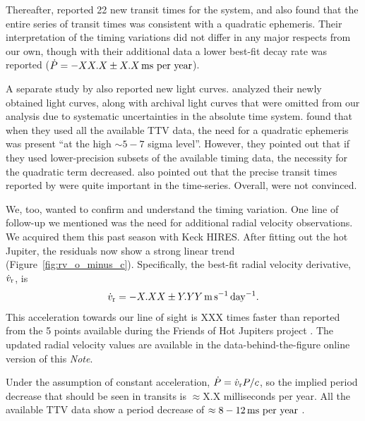 \documentclass[RNAAS]{aastex62}
\begin{document}
Thereafter, \citet{southworth_transit_2019} reported 22 new transit
times for the system, and also found that the entire series of transit
times was consistent with a quadratic ephemeris.  Their interpretation
of the timing variations did not differ in any major respects from our
own, though with their additional data a lower best-fit decay rate was
reported ($\dot{P} = -XX.X \pm X.X\,{\rm ms\ per\ year}$).

A separate study by \citet{baluev_homogeneously_2019} also reported
new light curves. \citeauthor{baluev_homogeneously_2019} analyzed
their newly obtained light curves, along with archival light curves
that were omitted from our analysis due to systematic uncertainties in
the absolute time system.  \citeauthor{baluev_homogeneously_2019}
found that when they used all the available TTV data, the need for a
quadratic ephemeris was present ``at the high $\sim 5-7$ sigma
level''.  However, they pointed out that if they used lower-precision
subsets of the available timing data, the necessity for the quadratic
term decreased.  \citeauthor{baluev_homogeneously_2019} also pointed
out that the precise transit times reported by
\citet{huitson_gemini_2017} were quite important in the time-series.
Overall, \citeauthor{baluev_homogeneously_2019} were not convinced.

We, too, wanted to confirm and understand the timing variation.  One
line of follow-up we mentioned was the need for additional radial
velocity observations.  We acquired them this past season with Keck
HIRES.
After fitting out the hot Jupiter, the residuals now show a strong
linear trend  (Figure~\ref{fig:rv_o_minus_c}).
Specifically, the best-fit radial velocity derivative, $\dot{v}_{\rm
r}$, is
\begin{equation}
  \dot{v}_{\rm r} = - X.XX \pm Y.YY\,{\rm m\,s^{-1}\,day^{-1}}.
\end{equation}
This acceleration towards our line of sight is XXX times faster than 
reported from the 5 points available during the Friends of Hot
Jupiters project \citep{knutson_friends_2014}.
The updated radial velocity values are available in the
data-behind-the-figure online version of this {\it Note}.

Under the assumption of constant acceleration, $\dot{P} = \dot{v}_{\rm
r} P / c$, so the implied period decrease that should be seen in
transits is $\approx$X.X milliseconds per year.
All the available TTV data show a period decrease of $\approx
8-12\,{\rm ms\ per\ year}$
\citep{bouma_wasp-4b_2019,southworth_transit_2019,baluev_homogeneously_2019}.
\end{document}
